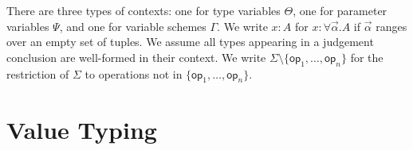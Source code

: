 \documentclass{article}
\theoremstyle{definition}
\theoremstyle{remark}
\newcommand{\op}{\mathsf{op}}
\newcommand{\G}{\Gamma}
\newcommand{\Sig}{\Sigma}
\begin{document}
There are three types of contexts: one for type variables $\Theta$, one for parameter variables $\Psi$, and one for variable schemes $\G$.
We write $x : A$ for $x : \forall \vec{\alpha}. A$ if $\vec{\alpha}$ ranges over an empty set of tuples.
We assume all types appearing in a judgement conclusion are well-formed in their context.
We write $\Sig \setminus \{\op_1, \ldots, \op_n\}$ for the restriction of $\Sig$ to operations not in $\{\op_1, \ldots, \op_n\}$.

\section{Value Typing}\label{sec:values}
\end{document}
